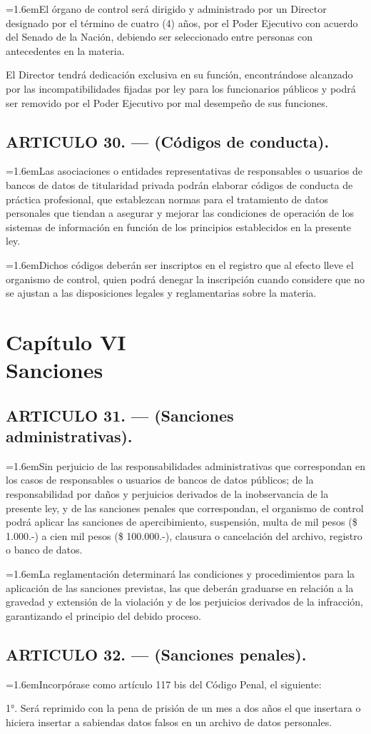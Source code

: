 \documentclass[10pt,a4paper]{article}
\newcommand{\capitulo}[2]{\section[#1 --- #2]{#1\\[2pt]#2}}
\newcommand{\articulo}[1]{\subsection{#1}}
\newcommand{\inciso}[2]{\par{\hangindent=1.6em\hangafter=1\makebox[1.6em][l]{#1}#2\par}}
\begin{document}
\inciso{3.}{El órgano de control será dirigido y administrado por un Director designado por el término de cuatro (4) años, por el Poder Ejecutivo con acuerdo del Senado de la Nación, debiendo ser seleccionado entre personas con antecedentes en la materia.}

El Director tendrá dedicación exclusiva en su función, encontrándose alcanzado por las incompatibilidades fijadas por ley para los funcionarios públicos y podrá ser removido por el Poder Ejecutivo por mal desempeño de sus funciones.

\articulo{ARTICULO 30. — (Códigos de conducta).}
\inciso{1.}{Las asociaciones o entidades representativas de responsables o usuarios de bancos de datos de titularidad privada podrán elaborar códigos de conducta de práctica profesional, que establezcan normas para el tratamiento de datos personales que tiendan a asegurar y mejorar las condiciones de operación de los sistemas de información en función de los principios establecidos en la presente ley.}

\inciso{2.}{Dichos códigos deberán ser inscriptos en el registro que al efecto lleve el organismo de control, quien podrá denegar la inscripción cuando considere que no se ajustan a las disposiciones legales y reglamentarias sobre la materia.}

\capitulo{Capítulo VI}{Sanciones}
\articulo{ARTICULO 31. — (Sanciones administrativas).}
\inciso{1.}{Sin perjuicio de las responsabilidades administrativas que correspondan en los casos de responsables o usuarios de bancos de datos públicos; de la responsabilidad por daños y perjuicios derivados de la inobservancia de la presente ley, y de las sanciones penales que correspondan, el organismo de control podrá aplicar las sanciones de apercibimiento, suspensión, multa de mil pesos (\$ 1.000.-) a cien mil pesos (\$ 100.000.-), clausura o cancelación del archivo, registro o banco de datos.}

\inciso{2.}{La reglamentación determinará las condiciones y procedimientos para la aplicación de las sanciones previstas, las que deberán graduarse en relación a la gravedad y extensión de la violación y de los perjuicios derivados de la infracción, garantizando el principio del debido proceso.}

\articulo{ARTICULO 32. — (Sanciones penales).}
\inciso{1.}{Incorpórase como artículo 117 bis del Código Penal, el siguiente:}

\textquotesingle{}1°. Será reprimido con la pena de prisión de un mes a dos años el que insertara o hiciera insertar a sabiendas datos falsos en un archivo de datos personales.
\end{document}
